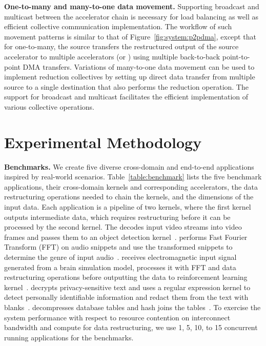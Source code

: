 \noindent \textbf{One-to-many and many-to-one data movement.} 
Supporting broadcast and multicast between the accelerator chain is necessary for load balancing as well as efficient collective communication implementation. 
%
The workflow of such movement patterns is similar to that of Figure~\ref{fig:system:p2pdma}, except that for one-to-many, the source \drx transfers the restructured output of the source accelerator to multiple accelerators (or \drxs) using multiple back-to-back point-to-point DMA transfers. 
%
Variations of many-to-one data movement can be used to implement reduction collectives by setting up direct data transfer from multiple source \drxs to a single destination \drx that also performs the reduction operation. 
%
The \dmx support for broadcast and multicast facilitates the efficient implementation of various collective operations. 


\section{Experimental Methodology}
\label{sec:method}

\noindent \textbf{Benchmarks.}
%
We create five diverse cross-domain and end-to-end applications inspired by real-world scenarios. 
%
Table~\ref{table:benchmark} lists the five benchmark applications, their cross-domain kernels and corresponding accelerators, the data restructuring operations needed to chain the kernels, and the dimensions of the input data.
%
Each application is a pipeline of two kernels, where the first kernel outputs intermediate data, which requires restructuring before it can be processed by the second kernel.
%
The  decodes input video streams into video frames and passes them to an object detection kernel~\cite{yolov3}.
%
 performs Fast Fourier Transform (FFT) on audio snippets and use the transformed snippets to determine the genre of input audio~\cite{urbansound-dataset:mm:2014}.
%
 receives electromagnetic input signal generated from a brain simulation model, processes it with FFT and data restructuring operations before outputting the data to reinforcement learning kernel~\cite{rldbs:ijcai:2020}. 
%
 decrypts privacy-sensitive text and uses a regular expression kernel to detect personally identifiable information and redact them from the text with blanks~\cite{microsoft-presidio}. 
%
 decompresses database tables and hash joins the tables~\cite{doppiodb:fpl:2017,chiosa:pvldb:2022}.   
%
To exercise the system performance with respect to resource contention on interconnect bandwidth and compute for data restructuring, we use 1, 5, 10, to 15 concurrent running applications for the benchmarks.
%


